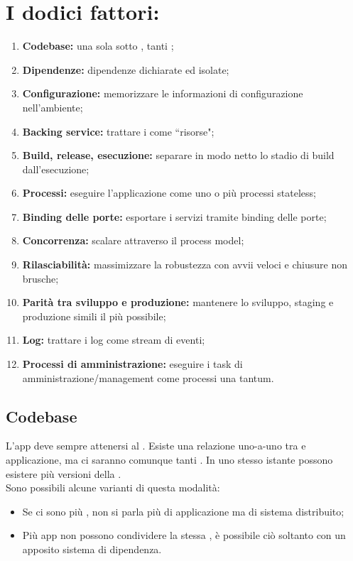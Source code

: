 \documentclass[NormeDiProgetto.tex]{subfiles}
\begin{document}
\section{I dodici fattori:}
\begin{enumerate}
\item \textbf{Codebase:} una sola  sotto , tanti ;
\item \textbf{Dipendenze:} dipendenze dichiarate ed isolate;
\item \textbf{Configurazione:} memorizzare le informazioni di configurazione nell'ambiente;
\item \textbf{Backing service:} trattare i  come \textquotedblleft risorse";
\item \textbf{Build, release, esecuzione:} separare in modo netto lo stadio di build dall'esecuzione;
\item \textbf{Processi:} eseguire l'applicazione come uno o più processi stateless;
\item \textbf{Binding delle porte:} esportare i servizi tramite binding delle porte;
\item \textbf{Concorrenza:} scalare attraverso il process model;
\item \textbf{Rilasciabilità:} massimizzare la robustezza con avvii veloci e chiusure non brusche;
\item \textbf{Parità tra sviluppo e produzione:} mantenere lo sviluppo, staging e produzione simili il più possibile;
\item \textbf{Log:} trattare i log come stream di eventi;
\item \textbf{Processi di amministrazione:} eseguire i task di amministrazione/management come processi una tantum.
\end{enumerate}

\subsection{Codebase}
L'app deve sempre attenersi al . Esiste una relazione uno-a-uno tra  e applicazione, ma ci saranno comunque tanti . In uno stesso istante possono esistere più versioni della .\\
Sono possibili alcune varianti di questa modalità:
\begin{itemize}
\item Se ci sono più , non si parla più di applicazione ma di sistema distribuito;
\item Più app non possono condividere la stessa , è possibile ciò soltanto con un apposito sistema di dipendenza.
\end{itemize}
\end{document}
